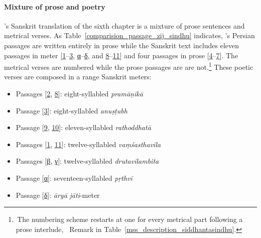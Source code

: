 \paragraph{Mixture of prose and poetry}\label{prose_poetry_siddhantasindhu_chapter_six}
\Nityananda's Sanskrit translation of the sixth chapter is a mixture of prose sentences and metrical verses. As Table~\ref{comparision_passage_zij_sindhu} indicates, \MullaFarid's Persian passages are written entirely in prose while the Sanskrit text includes eleven passages in meter [\hyperlink{Spass1}{1}--\hyperlink{Spass3}{3}, \hyperlink{SpassA}{α}--\hyperlink{SpassD}{δ}, and \hyperlink{Spass8}{8}--\hyperlink{Spass11}{11}] and four passages in prose [\hyperlink{Spass4}{4}--\hyperlink{Spass7}{7}]. The metrical verses are numbered while the prose passages are are not.\footnote{\,The numbering scheme restarts at one for every metrical part following a prose interlude, \vid\ Remark in Table~\ref{mss_description_siddhantasindhu}.} These poetic verses are composed in a range Sanskrit meters:
\begin{itemize}[topsep=0pt]
    \item Passages [\hyperlink{Spass2}{2}, \hyperlink{Spass8}{8}]: eight-syllabled \textit{pramāṇikā}
    \item Passage [\hyperlink{Spass3}{3}]: eight-syllabled \textit{anuṣṭubh}
    \item Passage [\hyperlink{Spass9}{9}, \hyperlink{Spass10}{10}]: eleven-syllabled \textit{rathoddhatā}
    \item Passages [\hyperlink{Spass1}{1}, \hyperlink{Spass11}{11}]: twelve-syllabled \textit{vaṃśasthavila}
    \item Passages [\hyperlink{SpassB}{β}, \hyperlink{SpassC}{γ}]: twelve-syllabled \textit{drutavilambita}
    \item Passage [\hyperlink{SpassA}{α}]: seventeen-syllabled \textit{pṛthvī}
    \item Passage [\hyperlink{SpassD}{δ}]: \textit{āryā} \textit{jāti}-meter
\end{itemize}

